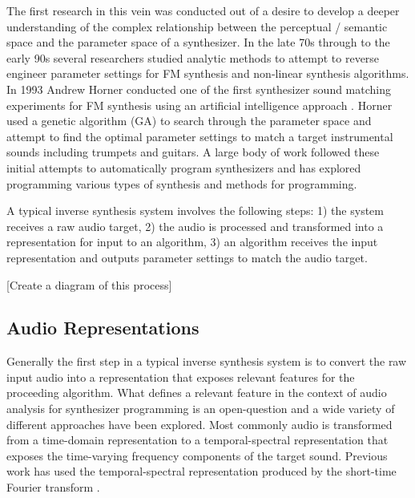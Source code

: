 The first research in this vein was conducted out of a desire to develop a deeper understanding of the complex relationship between the perceptual / semantic space and the parameter space of a synthesizer. In the late 70s through to the early 90s several researchers studied analytic methods to attempt to reverse engineer parameter settings for FM synthesis \cite{justice1979analytic, beauchamp1982synthesis, payne1987microcomputer} and non-linear synthesis \cite{delprat1990parameter} algorithms. In 1993 Andrew Horner conducted one of the first synthesizer sound matching experiments for FM synthesis using an artificial intelligence approach \cite{horner1993machine}. Horner used a genetic algorithm (GA) to search through the parameter space and attempt to find the optimal parameter settings to match a target instrumental sounds including trumpets and guitars. A large body of work followed these initial attempts to automatically program synthesizers and has explored programming various types of synthesis and methods for programming.

A typical inverse synthesis system involves the following steps: 1) the system receives a raw audio target, 2) the audio is processed and transformed into a representation for input to an algorithm, 3) an algorithm receives the input representation and outputs parameter settings to match the audio target.

[Create a diagram of this process]

\subsection{Audio Representations}
Generally the first step in a typical inverse synthesis system is to convert the raw input audio into a representation that exposes relevant features for the proceeding algorithm. What defines a relevant feature in the context of audio analysis for synthesizer programming is an open-question and a wide variety of different approaches have been explored. Most commonly audio is transformed from a time-domain representation to a temporal-spectral representation that exposes the time-varying frequency components of the target sound. Previous work has used the temporal-spectral representation produced by the short-time Fourier transform \cite{horner1995wavetable, horner1995envelope, horner1996piecewise, chinen2007genesynth, yee2007evolving, barkan2019inversynth}. 

